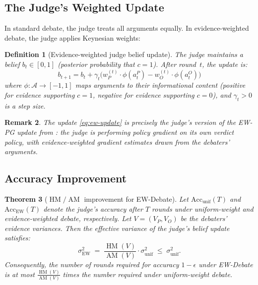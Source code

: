 \documentclass[11pt,a4paper]{article}
\newtheorem{theorem}{Theorem}[section]
\newtheorem{definition}[theorem]{Definition}
\newtheorem{remark}[theorem]{Remark}
\DeclareMathOperator{\AM}{AM}
\DeclareMathOperator{\HM}{HM}
\newcommand{\cA}{\mathcal{A}}
\begin{document}
\subsection{The Judge's Weighted Update}

In standard debate, the judge treats all arguments equally. In
evidence-weighted debate, the judge applies Keynesian weights:

\begin{definition}[Evidence-weighted judge belief update]
\label{def:ew-judge}
The judge maintains a belief $b_t \in [0, 1]$ (posterior probability
that $c = 1$). After round~$t$, the update is:
\begin{equation}\label{eq:ew-update}
    b_{t+1} = b_t + \gamma_t \bigl(
        w_P^{(t)} \cdot \phi(a_t^P) - w_O^{(t)} \cdot \phi(a_t^O)
    \bigr)
\end{equation}
where $\phi : \cA \to [-1, 1]$ maps arguments to their informational
content (positive for evidence supporting $c = 1$, negative for
evidence supporting $c = 0$), and $\gamma_t > 0$ is a step size.
\end{definition}

\begin{remark}
The update \eqref{eq:ew-update} is precisely the judge's version of
the EW-PG update from \cite{shcherbinin2026ewpg}: the judge is
performing policy gradient on its own verdict policy, with
evidence-weighted gradient estimates drawn from the debaters' arguments.
\end{remark}

\subsection{Accuracy Improvement}

\begin{theorem}[$\HM/\AM$ improvement for EW-Debate]
\label{thm:hm-am-debate}
Let $\text{Acc}_{\text{unif}}(T)$ and $\text{Acc}_{\text{EW}}(T)$ denote
the judge's accuracy after $T$ rounds under uniform-weight and
evidence-weighted debate, respectively. Let $V = (V_P, V_O)$ be the
debaters' evidence variances. Then the effective variance of the judge's
belief update satisfies:
\begin{equation}\label{eq:hm-am-debate}
    \sigma_{\text{EW}}^2
    \;=\; \frac{\HM(V)}{\AM(V)} \cdot \sigma_{\text{unif}}^2
    \;\leq\; \sigma_{\text{unif}}^2.
\end{equation}
Consequently, the number of rounds required for accuracy $1 - \epsilon$
under EW-Debate is at most $\frac{\HM(V)}{\AM(V)}$ times the number
required under uniform-weight debate.
\end{theorem}
\end{document}

